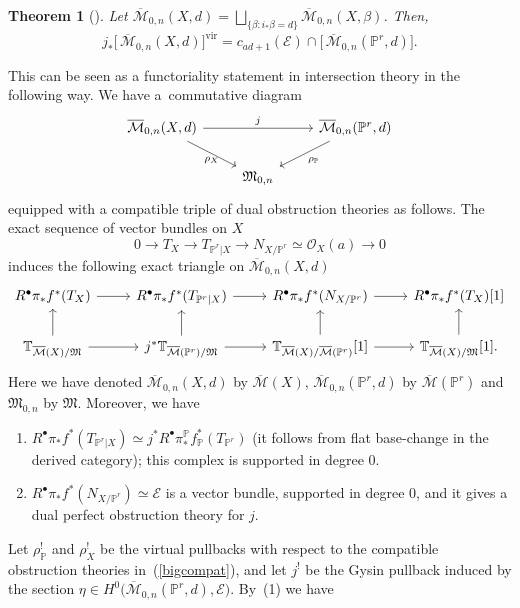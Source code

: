 \documentclass[pdftex]{sigma}
\numberwithin{equation}{section}
\newtheorem{Theorem}{Theorem}[section]
\newcommand{\vv}{\mathrm{vir}}
\newcommand{\PP}{\mathbb P}
\newcommand{\MM}[4]{\overline{\mathcal M}_{#1,#2}(#3,#4)}
\theoremstyle{plain}
\theoremstyle{definition}
\theoremstyle{remark}
\begin{document}
\begin{Theorem}[\cite{KKP}] Let $\MM{0}{n}{X}{d}=\bigsqcup_{\{\beta\colon i_*\beta=d\}}\MM{0}{n}{X}{\beta}$. Then,
 \[
 j_*\big[\,\MM{0}{n}{X}{d}\big]^{\vv}=c_{ad+1}(\mathcal{E})\cap\big[\,\MM{0}{n}{\mathbb P^r}{d}\big].
 \]
\end{Theorem}
This can be seen as a functoriality statement in intersection theory in the following way. We have a~commutative diagram
\[
\begin{tikzcd}
 \MM{0}{n}{X}{d} \ar[rr,"j"]\ar[dr,"\rho_X" below] & & \MM{0}{n}{\mathbb P^r}{d} \ar[dl,"\rho_\mathbb P"] \\
 & \mathfrak{M}_{0,n} &
\end{tikzcd}
\]
equipped with a compatible triple of dual obstruction theories as follows. The exact sequence of vector bundles on $X$
\[
 0\to T_X\to T_{\mathbb P^r|X}\to N_{X/\mathbb P^r}\simeq \mathcal O_X(a)\to 0
\]
induces the following exact triangle on $\MM{0}{n}{X}{d}$
\begin{equation}\label{bigcompat}
 \begin{tikzcd}
R^\bullet\pi_*f^* (T_X)\ar[r] & R^\bullet\pi_*f^* (T_{\mathbb P^r|X})\ar[r] & R^\bullet\pi_*f^* (N_{X/\mathbb P^r})\ar[r] & R^\bullet\pi_*f^* (T_X)[1]\\
\mathbb T_{\overline{\mathcal M}(X)/\mathfrak M}\ar[r]\ar[u] & j^*\mathbb T_{\overline{\mathcal M}(\mathbb P^r)/\mathfrak M}\ar[r]\ar[u] & \mathbb T_{\overline{\mathcal M}(X)/\overline{\mathcal M}(\mathbb P^r)}[1]\ar[r]\ar[u] & \mathbb T_{\overline{\mathcal M}(X)/\mathfrak M}[1]\ar[u].
 \end{tikzcd}
\end{equation}
Here we have denoted $\MM{0}{n}{X}{d}$ by $\overline{\mathcal M}(X)$, $\MM{0}{n}{\mathbb P^r}{d}$ by $\overline{\mathcal M}(\mathbb P^r)$ and $\mathfrak M_{0,n}$ by $\mathfrak M$. Moreover, we have
\begin{enumerate}\itemsep=0pt
 \item $R^\bullet\pi_*f^* (T_{\mathbb P^r|X})\simeq j^*R^\bullet\pi^{\mathbb P}_*f_{\mathbb P}^* (T_{\mathbb P^r})$ (it follows from flat base-change in the derived category); this complex is supported in degree 0.
 \item $R^\bullet\pi_*f^* (N_{X/\mathbb P^r})\simeq \mathcal{E}$ is a vector bundle, supported in degree 0, and it gives a dual perfect obstruction theory for $j$.
\end{enumerate}
Let $\rho_{\PP}^!$ and $\rho_{X}^!$ be the virtual pullbacks with respect to the compatible obstruction theories in~(\ref{bigcompat}), and let $j^!$ be the Gysin pullback induced by the section $\eta\in H^0\big(\MM{0}{n}{\mathbb P^r}{d},\mathcal{E}\big)$. By~(1) we have
\end{document}
